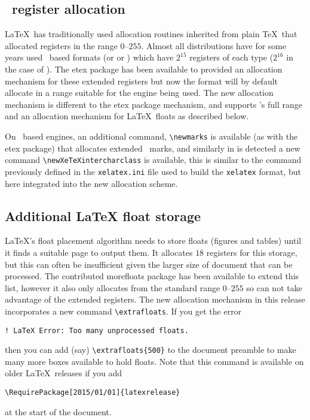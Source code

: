\documentclass{ltnews}
\begin{document}
\subsection{\eTeX\ register allocation}

\LaTeX\ has traditionally used allocation routines inherited from plain \TeX\
that allocated registers in the range $0$--$255$. Almost all distributions have
for some years used \eTeX\ based formats (or \hologo{XeTeX} or )
which have $2^{15}$ registers of each type ($2^{16}$ in the case of
\hologo{LuaTeX}). The \textsf{etex} package has been available to provided an
allocation mechanism for these extended registers but now the format will by
default allocate in a range suitable for the engine being used. The new
allocation mechanism is different to the \textsf{etex} package mechanism, and
supports \hologo{LuaTeX}'s full range and an allocation mechanism for \LaTeX\
floats as described below.

On \eTeX\ based engines, an additional command, \verb|\newmarks| is available
(as with the \textsf{etex} package) that allocates extended \eTeX\ marks, and
similarly in \hologo{XeTeX} is detected a new command
\verb|\newXeTeXintercharclass| is available, this is similar to the command
previously defined in the \texttt{xelatex.ini} file used to build the
\texttt{xelatex} format, but here integrated into the new allocation scheme.

\subsection{Additional LaTeX float storage}

\LaTeX's float placement algorithm needs to store floats (figures and tables)
until it finds a suitable page to output them. It allocates $18$ registers for
this storage, but this can often be insufficient given the larger size of
document that can be processed. The contributed \textsf{morefloats} package has
been available to extend this list, however it also only allocates from the
standard range $0$--$255$ so can not take advantage of the extended registers.
The new allocation mechanism in this release incorporates a new command
\verb|\extrafloats|. If you get the error
\begin{verbatim}
! LaTeX Error: Too many unprocessed floats.
\end{verbatim}
then you can add (say) \verb|\extrafloats{500}| to the document preamble to
make many more boxes available to hold floats. Note that this command is
available on older \LaTeX\ releases if you add
\begin{verbatim}
\RequirePackage[2015/01/01]{latexrelease}
\end{verbatim}
at the start of the document.
\end{document}
